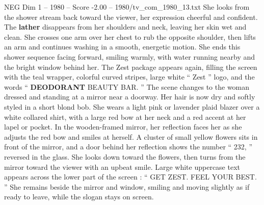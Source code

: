 \begin{textsample}{NEG Dim 1 – 1980 – Score -2.00 – 1980/tv\_com\_1980\_13.txt}
She looks from the shower stream back toward the viewer, her expression cheerful and confident.
The \textbf{lather} disappears from her shoulders and neck, leaving her skin wet and clean.
She crosses one arm over her chest to rub the opposite shoulder, then lifts an arm and continues washing in a smooth, energetic motion.
She ends this shower sequence facing forward, smiling warmly, with water running nearby and the bright window behind her.
The Zest package appears again, filling the screen with the teal wrapper, colorful curved stripes, large white “ Zest ” logo, and the words “ \textbf{DEODORANT} BEAUTY BAR. ” The scene changes to the woman dressed and standing at a mirror near a doorway.
Her hair is now dry and softly styled in a short blond bob.
She wears a light pink or lavender plaid blazer over a white collared shirt, with a large red bow at her neck and a red accent at her lapel or pocket.
In the wooden-framed mirror, her reflection faces her as she adjusts the red bow and smiles at herself.
A cluster of small yellow flowers sits in front of the mirror, and a door behind her reflection shows the number “ 232, ” reversed in the glass.
She looks down toward the flowers, then turns from the mirror toward the viewer with an upbeat smile.
Large white uppercase text appears across the lower part of the screen : “ GET ZEST.
FEEL YOUR BEST. ” She remains beside the mirror and window, smiling and moving slightly as if ready to leave, while the slogan stays on screen.

\end{textsample}
